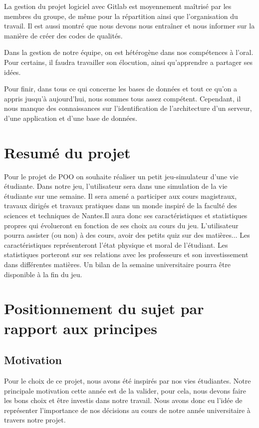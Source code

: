 \documentclass[12pt]{article}
\begin{document}
\par{\vspace*{.5mm} La gestion du projet logiciel avec Gitlab est moyennement maîtrisé par les membres du groupe, de même pour la répartition ainsi que l’organisation du travail. Il est aussi montré que nous devons nous entraîner et nous informer sur la manière de créer des codes de qualités.}

\par{\vspace*{.5mm}Dans la gestion de notre équipe, on est hétérogène dans nos compétences à l’oral. Pour certains, il faudra travailler son élocution, ainsi qu’apprendre a partager ses idées.}

\par{\vspace*{.5mm} Pour finir, dans tous ce qui concerne les bases de données et tout ce qu’on a appris jusqu’à aujourd’hui, nous sommes tous assez compétent. Cependant, il nous manque des connaissances sur l’identification de l’architecture d’un serveur, d’une application et d’une base de données.}

\section{Resumé du projet}
Pour le projet de POO on souhaite réaliser un petit jeu-simulateur d’une vie étudiante. 
Dans notre jeu, l’utilisateur sera dans une simulation de la vie étudiante sur une semaine. Il sera amené a participer aux cours magistraux, travaux dirigés et travaux pratiques dans un monde inspiré de la faculté des sciences et techniques de Nantes.Il aura donc ses caractéristiques et statistiques propres qui évolueront en fonction de ses choix au cours du jeu. L’utilisateur pourra assister (ou non) à des cours, avoir des petits quiz sur des matières... Les caractéristiques représenteront l’état physique et moral de l’étudiant. Les statistiques porteront sur ses relations avec les professeurs et son investissement dans différentes matières. Un bilan de la semaine universitaire pourra être disponible à la fin du jeu.
\section{Positionnement du sujet par rapport aux principes}
\subsection{Motivation}
\par{\vspace*{.5mm} Pour le choix de ce projet, nous avons été inspirés par nos vies étudiantes. Notre principale motivation cette année est de la valider, pour cela, nous devons faire les bons choix et être investis dans notre travail. Nous avons donc eu l’idée de représenter l’importance de nos décisions au cours de notre année universitaire à travers notre projet.}
\end{document}
